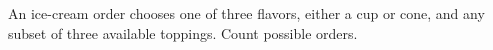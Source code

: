An ice-cream order chooses one of three flavors, either a cup or cone, and any subset of three available toppings. Count possible orders.
